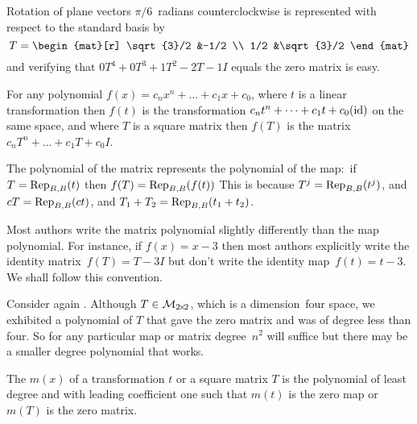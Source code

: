 \begin{example}  \label{ex:PolySendRotMatToZ}
Rotation of plane vectors \( \pi/6 \)~radians counterclockwise is represented
with respect to the standard basis by
\begin{equation*}
  T=
  \begin{mat}[r]
     \sqrt{3}/2  &-1/2  \\
     1/2         &\sqrt{3}/2
  \end{mat}
\end{equation*}
and verifying that \( 0T^4+0T^3+1T^2-2T-1I \) equals the zero matrix is easy.
\end{example}

\begin{definition}
For any polynomial \( f(x)=c_nx^n+\dots+c_1x+c_0 \),
where \( t \) is a linear transformation then \( f(t) \) is the
transformation \( c_nt^n+\dots+c_1t+c_0(\identity) \) on the same space, and
where \( T \) is a square matrix then \( f(T) \) is
the matrix \( c_nT^n+\dots+c_1T+c_0I \).
\end{definition}

\noindent The polynomial of the matrix represents the polynomial of the map:~if 
\( T=\rep{t}{B,B} \) then \( f(T)=\rep{f(t)}{B,B} \)
This is because \( T^j=\rep{t^j}{B,B} \),
and \( cT=\rep{ct}{B,B} \), and \( T_1+T_2 =\rep{t_1+t_2}{B,B} \).

\begin{remark}
Most authors write the matrix polynomial slightly differently than the 
map polynomial. 
For instance, if  \( f(x)=x-3 \) then 
most authors explicitly write the identity matrix~\( f(T)=T-3I \)
but don't write the identity map~\( f(t)=t-3 \).
We shall follow this convention.
\end{remark}

Consider again .
Although $T\in\matspace_{\nbyn{2}}$, which is a dimension~four space,
we exhibited a polynomial of $T$ that gave the zero matrix
and was of degree less than four. 
So for any particular map or matrix
degree~$n^2$ will suffice but there may be a smaller degree polynomial that
works.

\begin{definition}
The %
\( m(x) \) of a transformation \( t \)
or a square matrix \( T \) is the
polynomial of least degree and with leading coefficient one
such that \( m(t) \) is the zero map or \( m(T) \) is the zero matrix.
\end{definition}

